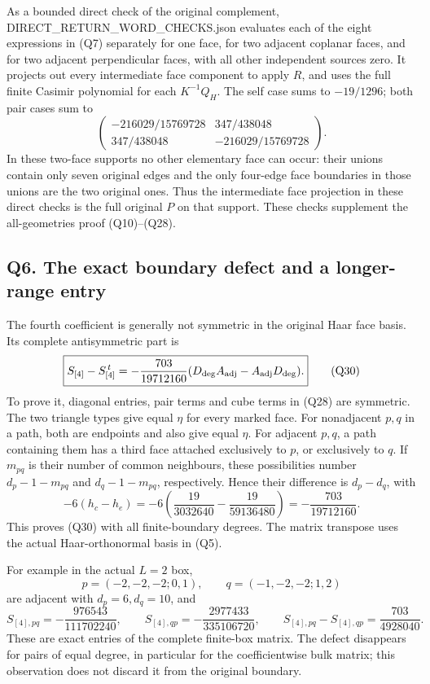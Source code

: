 \documentclass[11pt]{article}
\begin{document}
As a bounded direct check of the original complement, DIRECT\_RETURN\_WORD\_CHECKS.json evaluates each of the eight expressions in (Q7) separately for one face, for two adjacent coplanar faces, and for two adjacent perpendicular faces, with all other independent sources zero. It projects out every intermediate face component to apply \(R\), and uses the full finite Casimir polynomial for each \(K^{-1}Q_H\). The self case sums to \(-19/1296\); both pair cases sum to
\[
 \begin{pmatrix}
 -216029/15769728&347/438048\\
 347/438048&-216029/15769728
 \end{pmatrix}.
 \tag{Q29}
\]
In these two-face supports no other elementary face can occur: their unions contain only seven original edges and the only four-edge face boundaries in those unions are the two original ones. Thus the intermediate face projection in these direct checks is the full original \(P\) on that support. These checks supplement the all-geometries proof (Q10)–(Q28).

\subsection*{Q6. The exact boundary defect and a longer-range entry}

The fourth coefficient is generally not symmetric in the original Haar face basis. Its complete antisymmetric part is
\[
 \boxed{
 S_{[4]}-S_{[4]}^{\,t}
 =-\frac{703}{19712160}
       (D_{\rm deg}A_{\rm adj}-A_{\rm adj}D_{\rm deg}).}
 \tag{Q30}
\]
To prove it, diagonal entries, pair terms and cube terms in (Q28) are symmetric. The two triangle types give equal \(\eta\) for every marked face. For nonadjacent \(p,q\) in a path, both are endpoints and also give equal \(\eta\). For adjacent \(p,q\), a path containing them has a third face attached exclusively to \(p\), or exclusively to \(q\). If \(m_{pq}\) is their number of common neighbours, these possibilities number \(d_p-1-m_{pq}\) and \(d_q-1-m_{pq}\), respectively. Hence their difference is \(d_p-d_q\), with
\[
 -6(h_c-h_e)
 =-6\left(\frac{19}{3032640}-\frac{19}{59136480}\right)
 =-\frac{703}{19712160}.
\]
This proves (Q30) with all finite-boundary degrees. The matrix transpose uses the actual Haar-orthonormal basis in (Q5).

For example in the actual \(L=2\) box,
\[
 p=(-2,-2,-2;0,1),\qquad q=(-1,-2,-2;1,2)
\]
are adjacent with \(d_p=6,d_q=10\), and
\[
 S_{[4],pq}=-\frac{976543}{111702240},\qquad
 S_{[4],qp}=-\frac{2977433}{335106720},\qquad
 S_{[4],pq}-S_{[4],qp}=\frac{703}{4928040}.
 \tag{Q31}
\]
These are exact entries of the complete finite-box matrix. The defect disappears for pairs of equal degree, in particular for the coefficientwise bulk matrix; this observation does not discard it from the original boundary.
\end{document}
